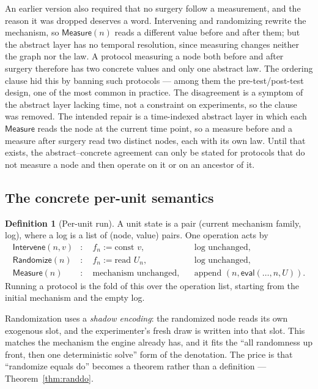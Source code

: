 \documentclass[11pt,a4paper]{article}
\theoremstyle{definition}
\newtheorem{definition}{Definition}[section]
\theoremstyle{plain}
\theoremstyle{remark}
\newcommand{\ev}{\mathsf{eval}}
\begin{document}
An earlier version also required that no surgery follow a measurement, and
the reason it was dropped deserves a word. Intervening and randomizing
rewrite the mechanism, so $\mathsf{Measure}(n)$ reads a different value
before and after them; but the abstract layer has no temporal resolution,
since measuring changes neither the graph nor the law. A protocol measuring
a node both before and after surgery therefore has two concrete values and
only one abstract law. The ordering clause hid this by banning such
protocols --- among them the pre-test/post-test design, one of the most
common in practice. The disagreement is a symptom of the abstract layer
lacking time, not a constraint on experiments, so the clause was removed.
The intended repair is a time-indexed abstract layer in which each
$\mathsf{Measure}$ reads the node at the current time point, so a measure
before and a measure after surgery read two distinct nodes, each with its
own law. Until that exists, the abstract--concrete agreement can only be
stated for protocols that do not measure a node and then operate on it or
on an ancestor of it.

\subsection{The concrete per-unit semantics}

\begin{definition}[Per-unit run]
A unit state is a pair (current mechanism family, log), where a log is a
list of (node, value) pairs. One operation acts by
\[
\begin{aligned}
  \mathsf{Intervene}(n,v) &: \quad f_n := \text{const } v, &&\text{log unchanged},\\
  \mathsf{Randomize}(n)   &: \quad f_n := \text{read } U_n, &&\text{log unchanged},\\
  \mathsf{Measure}(n)     &: \quad \text{mechanism unchanged}, &&\text{append } (n, \ev(\dots,n,U)).
\end{aligned}
\]
Running a protocol is the fold of this over the operation list, starting
from the initial mechanism and the empty log.
\end{definition}

Randomization uses a \emph{shadow encoding}: the randomized node reads its
own exogenous slot, and the experimenter's fresh draw is written into that
slot. This matches the mechanism the engine already has, and it fits the
``all randomness up front, then one deterministic solve'' form of the
denotation. The price is that ``randomize equals $\mathrm{do}$'' becomes a
theorem rather than a definition --- Theorem~\ref{thm:randdo}.
\end{document}
